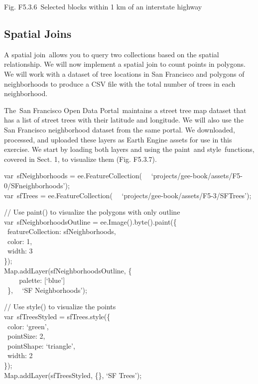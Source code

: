 \documentclass[
  letterpaper,
  DIV=11,
  numbers=noendperiod]{scrreprt}
\begin{document}
Fig. F5.3.6~Selected blocks within 1 km of an interstate highway

\hypertarget{spatial-joins}{%
\subsection{Spatial Joins}\label{spatial-joins}}

A spatial join~allows you to query two collections based on the spatial
relationship. We will now implement a spatial join to count points in
polygons. We will work with a dataset of tree locations in San Francisco
and polygons of neighborhoods to produce a CSV file with the total
number of trees in each neighborhood.

The~San Francisco Open Data Portal~maintains a street tree map dataset
that has a list of street trees with their latitude and longitude. We
will also use the San Francisco neighborhood dataset from the same
portal. We downloaded, processed, and uploaded these layers as Earth
Engine assets for use in this exercise. We start by loading both layers
and using the paint~and style~functions, covered in Sect. 1, to
visualize them (Fig. F5.3.7).

var~sfNeighborhoods = ee.FeatureCollection(~
~`projects/gee-book/assets/F5-0/SFneighborhoods');\\
var~sfTrees = ee.FeatureCollection(~
~`projects/gee-book/assets/F5-3/SFTrees');

// Use paint() to visualize the polygons with only outline\\
var~sfNeighborhoodsOutline = ee.Image().byte().paint(\{\\
\hspace*{0.333em} ~featureCollection: sfNeighborhoods,\\
\hspace*{0.333em} ~color: 1,\\
\hspace*{0.333em} ~width: 3\\
\});\\
Map.addLayer(sfNeighborhoodsOutline, \{\\
\hspace*{0.333em} ~ ~ ~palette: {[}`blue'{]}\\
\hspace*{0.333em} ~\},~ ~`SF Neighborhoods');

// Use style() to visualize the points\\
var~sfTreesStyled = sfTrees.style(\{\\
\hspace*{0.333em} ~color: `green',\\
\hspace*{0.333em} ~pointSize: 2,\\
\hspace*{0.333em} ~pointShape: `triangle',\\
\hspace*{0.333em} ~width: 2\\
\});\\
Map.addLayer(sfTreesStyled, \{\}, `SF Trees');
\end{document}
